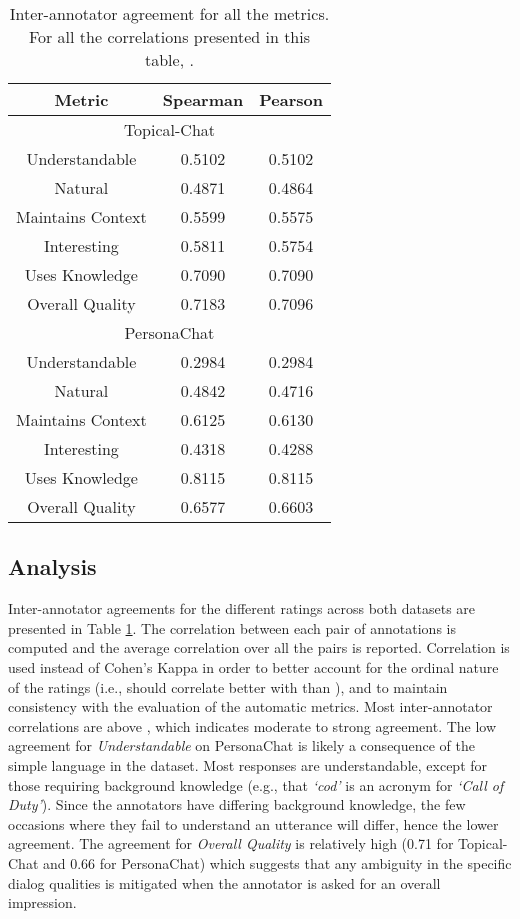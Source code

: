 \documentclass[11pt,a4paper]{article}
\begin{document}
\begin{table}
    \centering
    \begin{tabular}{|c|c|c|}
    \hline
    \textbf{Metric}  & \textbf{Spearman} & \textbf{Pearson} \\ \hline
    \multicolumn{3}{|c|}{Topical-Chat} \\ \hline
    Understandable & 0.5102 & 0.5102 \\
    Natural & 0.4871 & 0.4864 \\
    Maintains Context & 0.5599 & 0.5575 \\    
    Interesting & 0.5811 & 0.5754 \\   
    Uses Knowledge & 0.7090 & 0.7090 \\    
    Overall Quality & 0.7183 & 0.7096 \\    \hline
    \multicolumn{3}{|c|}{PersonaChat} \\ \hline
    Understandable & 0.2984 & 0.2984 \\
    Natural & 0.4842 & 0.4716 \\
    Maintains Context & 0.6125 & 0.6130 \\    
    Interesting & 0.4318 & 0.4288 \\   
    Uses Knowledge & 0.8115 & 0.8115 \\    
    Overall Quality & 0.6577 & 0.6603 \\    \hline
    \end{tabular}
    \caption{Inter-annotator agreement for all the metrics. For all the correlations presented in this table, .}
    \label{tab:agreement}
\end{table}

\subsection{Analysis}

Inter-annotator agreements for the different ratings across both datasets are presented in Table \ref{tab:agreement}. The correlation between each pair of annotations is computed and the average correlation over all the pairs is reported. Correlation is used instead of Cohen's Kappa in order to better account for the ordinal nature of the ratings (i.e.,  should correlate better with  than ), and to maintain consistency with the evaluation of the automatic metrics. Most inter-annotator correlations are above , which indicates moderate to strong agreement. The low agreement for \textit{Understandable} on PersonaChat is likely a consequence of the simple language in the dataset. Most responses are understandable, except for those requiring background knowledge (e.g., that \textit{`cod'} is an acronym for \textit{`Call of Duty'}). Since the annotators have differing background knowledge, the few occasions where they fail to understand an utterance will differ, hence the lower agreement. The agreement for \textit{Overall Quality} is relatively high (0.71 for Topical-Chat and 0.66 for PersonaChat) which suggests that any ambiguity in the specific dialog qualities is mitigated when the annotator is asked for an overall impression.
\end{document}
